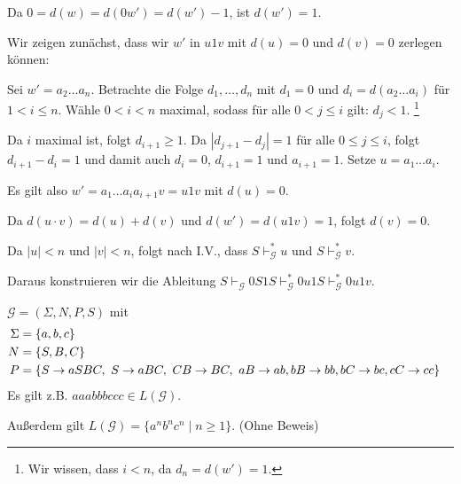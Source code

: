 \begin{Bsp}
{\begin{itemize}[font=\normalfont]
  Da $0 = d(w) = d(0w') = d(w') - 1$, ist $d(w') = 1$.
  
  \medskip

  Wir zeigen zunächst, dass wir $w'$ in $u1v$ mit $d(u) = 0$ und $d(v) = 0$ zerlegen können:

    Sei $w' = a_2 \ldots a_n$.
    Betrachte die Folge $d_1,\ldots,d_n$ mit $d_1 = 0$ und $d_i = d(a_2\ldots a_i)$ für $1 < i \leq n$.
    Wähle $0 < i < n$ maximal, sodass für alle $0 < j \le i$ gilt: $d_j < 1$.%
    \footnote{Wir wissen, dass $i < n$, da $d_n = d(w') = 1$.}

    Da $i$ maximal ist, folgt $d_{i+1} \ge 1$.
    Da $|d_{j+1} - d_j| = 1$ für alle $0 \le j \le i$, folgt $d_{i+1}
    - d_i = 1$ und damit auch $d_i = 0$, $d_{i+1} = 1$ und $a_{i+1} =
    1$. 
    Setze $u = a_1\ldots a_{i}$.

    Es gilt also $w' = a_1\ldots a_{i}a_{i+1}v = u1v$ mit $d(u) = 0$.

    Da $d(u \cdot v) = d(u) + d(v)$ und $d(w') = d(u1v) = 1$, folgt $d(v) = 0$.
  \bigskip
  \goodbreak

  Da $|u| < n$ und $|v| < n$, folgt nach I.V., dass $S
  \vdash^*_{\mathcal{G}} u$ und $S \vdash^*_{\mathcal{G}} v$. 

  Daraus konstruieren wir die Ableitung
  $S \vdash_{\mathcal{G}} 0S1S \vdash^*_{\mathcal{G}} 0u1S \vdash^*_{\mathcal{G}} 0u1v$.
  \qedhere
\end{itemize}
}
\end{Bsp}

\begin{Bsp}\label{bsp:3.anbncn}
	$\mathcal{G}=(\Sigma,N,P,S)$ mit
	\begin{align*}
		\Sigma &= \{a,b,c\}\\
		N &= \{S,B,C\}\\
		P &= 
		\begin{aligned}[t]
			 \{ &S \-> aSBC,\ S\->aBC,\ CB\-> BC,\ aB\-> ab,
			bB\-> bb, bC\-> bc, cC\-> cc \}
		\end{aligned}
	\end{align*}
Es gilt z.B. $aaabbbccc\in L(\mathcal{G})$.

Außerdem gilt $L(\mathcal{G}) =  \{ a^nb^nc^n \mid n\geq 1 \}$. (Ohne Beweis)
\end{Bsp}

